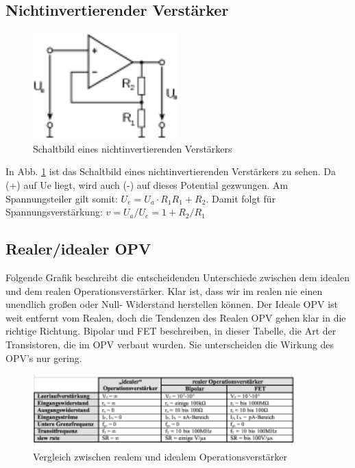 \subsection{Nichtinvertierender Verstärker}

\begin{figure}[H]
    \centering
    \includegraphics[width=0.5\textwidth]{Abb/ninv.pdf} 
    \caption{Schaltbild eines nichtinvertierenden Verstärkers}
    \label{ninv}
\end{figure}
In Abb. \ref{ninv} ist das Schaltbild eines nichtinvertierenden Verstärkers zu sehen. Da (+) auf Ue liegt, wird auch (-) auf dieses Potential gezwungen. Am Spannungsteiler gilt somit:
$U_e=U_a·R_1R_1+R_2$. 
Damit folgt für Spannungsverstärkung:
$v=U_a/U_e=1+R_2/R_1$

\subsection{Realer/idealer OPV}

Folgende Grafik beschreibt die entscheidenden Unterschiede zwischen dem idealen und dem realen Operationsverstärker.
Klar ist, dass wir im realen nie einen unendlich großen oder Null- Widerstand herstellen können. Der Ideale OPV ist weit entfernt vom Realen, doch die Tendenzen des Realen OPV gehen klar in die richtige Richtung. Bipolar und FET beschreiben, in dieser Tabelle, die Art der Transistoren, die im OPV verbaut wurden. Sie unterscheiden die Wirkung des OPV’s nur gering.

\begin{figure}[H]
     \centering
     \includegraphics[width=0.9\textwidth]{Abb/vergl.pdf}
     \caption{Vergleich zwischen realem und idealem Operationsverstärker}
\end{figure}

